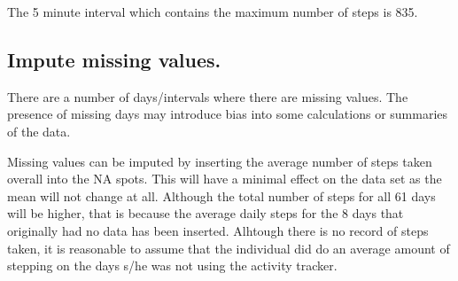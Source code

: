 \documentclass[]{article}
\newenvironment{Shaded}{\begin{snugshade}}{\end{snugshade}}
\newcommand{\KeywordTok}[1]{\textcolor[rgb]{0.13,0.29,0.53}{\textbf{#1}}}
\newcommand{\DataTypeTok}[1]{\textcolor[rgb]{0.13,0.29,0.53}{#1}}
\newcommand{\StringTok}[1]{\textcolor[rgb]{0.31,0.60,0.02}{#1}}
\newcommand{\OtherTok}[1]{\textcolor[rgb]{0.56,0.35,0.01}{#1}}
\newcommand{\OperatorTok}[1]{\textcolor[rgb]{0.81,0.36,0.00}{\textbf{#1}}}
\newcommand{\NormalTok}[1]{#1}
\begin{document}
The 5 minute interval which contains the maximum number of steps is 835.

\subsection{Impute missing values.}\label{impute-missing-values.}

There are a number of days/intervals where there are missing values. The
presence of missing days may introduce bias into some calculations or
summaries of the data.

Missing values can be imputed by inserting the average number of steps
taken overall into the NA spots. This will have a minimal effect on the
data set as the mean will not change at all. Although the total number
of steps for all 61 days will be higher, that is because the average
daily steps for the 8 days that originally had no data has been
inserted. Alhtough there is no record of steps taken, it is reasonable
to assume that the individual did do an average amount of stepping on
the days s/he was not using the activity tracker.

\begin{Shaded}
\end{Shaded}
\end{document}
